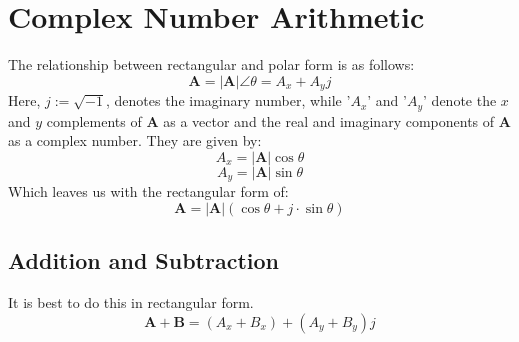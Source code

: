 \documentclass{article}
\begin{document}
	\section[Arithmetic]{Complex Number Arithmetic}
	The relationship between rectangular and polar form is as follows:
	$$\mathbf{A}= |\mathbf{A}|\angle\theta = A_x + A_yj$$
	Here, $j:=\sqrt{-1}$, denotes the imaginary number, while '$A_x$' and 
	'$A_y$' denote the $x$ and $y$ complements of $\mathbf{A}$ as a vector and 
	the real and imaginary components of $\mathbf{A}$ as a complex number.  
	They are given by:
	$$ A_x = |\mathbf{A}|\cos\theta$$
	$$ A_y = |\mathbf{A}|\sin\theta$$
	Which leaves us with the rectangular form of:
	$$ \mathbf{A} = |\mathbf{A}|(\cos\theta + j\cdot\sin\theta)$$
	\subsection[Addition]{Addition and Subtraction}
	It is best to do this in rectangular form.
	$$\mathbf{A} + \mathbf{B} = (A_x + B_x) + (A_y+B_y)j$$
\end{document}
